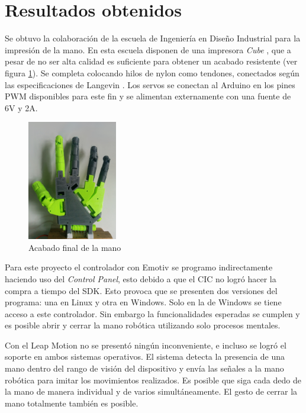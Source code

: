 \documentclass[letterpaper,journal,transmag]{IEEEtran}
\begin{document}
\section{Resultados obtenidos}
Se obtuvo la colaboración de la escuela de Ingeniería en Diseño Industrial para
la impresión de la mano. En esta escuela disponen de una impresora \emph{Cube}
\cite{_cubify_????}, que a pesar de no ser alta calidad es suficiente para
obtener un acabado resistente (ver figura \ref{fig:mano}). Se completa colocando
hilos de nylon como
tendones, conectados según las especificaciones de Langevin
\cite{langevin_inmoov_????}. Los servos se conectan al Arduino en los pines PWM
disponibles para este fin y se alimentan externamente con una fuente de 6V y 2A.

      \begin{figure}[ht]
         \includegraphics[width=0.35\textwidth]{mano}
         \caption{Acabado final de la mano}
         \label{fig:mano}
      \end{figure}
Para este proyecto el controlador con Emotiv se programo indirectamente
haciendo uso del \emph{Control Panel}, esto debido a que el CIC no logró hacer
la compra a tiempo del SDK. Esto provoca que se presenten dos versiones del
programa: una en Linux y otra en Windows. Solo en la de Windows se tiene acceso
a este controlador. Sin embargo la funcionalidades esperadas se cumplen y es
posible abrir y cerrar la mano robótica utilizando solo procesos mentales.

Con el Leap Motion no se presentó ningún inconveniente, e incluso se logró el
soporte en ambos sistemas operativos. El sistema detecta la presencia de una
mano dentro del rango de visión del dispositivo y envía las señales a la mano
robótica para imitar los movimientos realizados. Es posible que siga cada dedo
de la mano de manera individual y de varios simultáneamente. El gesto de cerrar
la mano totalmente también es posible.
\end{document}
